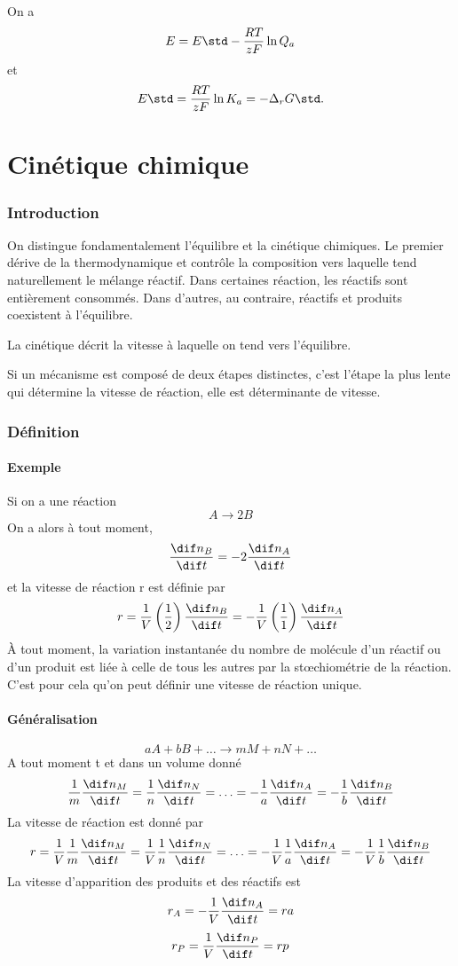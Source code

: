 On a
\[ E = E\std - \frac{RT}{zF} \ln Q_a \]
et
\[ E\std = \frac{RT}{zF} \ln K_a = -\Delta_r G\std. \]

\part{Cinétique chimique}
\section{Introduction}
On distingue fondamentalement l'équilibre et la cinétique chimiques.
Le premier dérive de la thermodynamique et contrôle la composition vers
laquelle tend naturellement le mélange réactif.
Dans certaines réaction, les réactifs sont entièrement consommés.
Dans d'autres, au contraire, réactifs et produits coexistent à l'équilibre.

La cinétique décrit la vitesse à laquelle on tend vers l'équilibre.

Si un mécanisme est composé de deux étapes distinctes,
c'est l'étape la plus lente qui détermine la vitesse de réaction,
elle est déterminante de vitesse.
\section{Définition}
\subsection{Exemple}
Si on a une réaction
\[ A \longrightarrow 2B \]
On  a alors à tout moment,
\[ \frac{\dif n_B}{\dif t} = -2\frac{\dif n_A}{\dif t} \]
et la vitesse de réaction r est définie par
\[ r = \frac 1V \left(\frac 12 \right)\frac{\dif n_B}{\dif t} =
-\frac 1V \left(\frac 11 \right) \frac{\dif n_A}{\dif t} \]
À tout moment, la variation instantanée du nombre de molécule d'un
réactif ou d'un produit est liée à celle de tous les autres
par la stœchiométrie de la réaction.
C'est pour cela qu'on peut définir une vitesse de réaction unique.

\subsection{Généralisation}
\[ aA+bB+\ldots \longrightarrow mM + nN + \ldots \]
A tout moment t et dans un volume donné
\[ \frac 1m \frac {\dif n_M}{\dif t} = \frac 1n \frac{\dif n_N}{\dif t}
  = \ldots = -\frac 1a \frac{\dif n_A}{\dif t}
  = -\frac 1b \frac{\dif n_B}{\dif t} \]
La vitesse de réaction est donné par
  \[ r = \frac 1V \frac 1m \frac {\dif n_M}{\dif t} =
  \frac 1V \frac 1n \frac {\dif n_N}{\dif t} = \ldots =
  -\frac 1V \frac 1a \frac {\dif n_A}{\dif t}
  = -\frac 1V \frac 1b \frac {\dif n_B}{\dif t} \]
La vitesse d'apparition des produits et des réactifs est
\[ r_A = -\frac 1V \frac {\dif n_A}{\dif t} = ra \]
\[ r_P = \frac 1V \frac {\dif n_P}{\dif t} = rp \]

